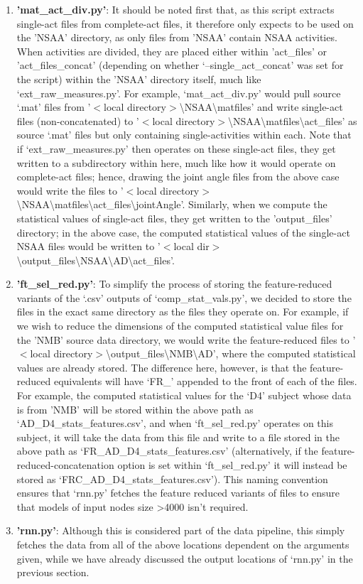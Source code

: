 \documentclass[12pt,twoside]{report}
\begin{document}
\begin{enumerate}
	\item \textbf{'mat\_act\_div.py'}: It should be noted first that, as this script extracts single-act files from complete-act files, it therefore only expects to be used on the 'NSAA' directory, as only files from 'NSAA' contain NSAA activities. When activities are divided, they are placed either within 'act\_files' or 'act\_files\_concat' (depending on whether ‘--single\_act\_concat’ was set for the script) within the 'NSAA' directory itself, much like ‘ext\_raw\_measures.py’. For example, ‘mat\_act\_div.py’ would pull source ‘.mat’ files from '$<$local directory$>$\textbackslash NSAA\textbackslash matfiles' and write single-act files (non-concatenated) to '$<$local directory$>$\textbackslash NSAA\textbackslash matfiles\textbackslash act\_files' as source ‘.mat’ files but only containing single-activities within each. Note that if ‘ext\_raw\_measures.py’ then operates on these single-act files, they get written to a subdirectory within here, much like how it would operate on complete-act files; hence, drawing the joint angle files from the above case would write the files to '$<$local directory$>$\textbackslash NSAA\textbackslash matfiles\textbackslash act\_files\textbackslash jointAngle'. Similarly, when we compute the statistical values of single-act files, they get written to the 'output\_files' directory; in the above case, the computed statistical values of the single-act NSAA files would be written to '$<$local dir$>$\textbackslash output\_files\textbackslash NSAA\textbackslash AD\textbackslash act\_files'.
	\item \textbf{'ft\_sel\_red.py'}: To simplify the process of storing the feature-reduced variants of the ‘.csv’ outputs of ‘comp\_stat\_vals.py’, we decided to store the files in the exact same directory as the files they operate on. For example, if we wish to reduce the dimensions of the computed statistical value files for the 'NMB' source data directory, we would write the feature-reduced files to '$<$local directory$>$\textbackslash output\_files\textbackslash NMB\textbackslash AD', where the computed statistical values are already stored. The difference here, however, is that the feature-reduced equivalents will have ‘FR\_’ appended to the front of each of the files. For example, the computed statistical values for the ‘D4’ subject whose data is from 'NMB' will be stored within the above path as ‘AD\_D4\_stats\_features.csv’, and when ‘ft\_sel\_red.py’ operates on this subject, it will take the data from this file and write to a file stored in the above path as ‘FR\_AD\_D4\_stats\_features.csv’ (alternatively, if the feature-reduced-concatenation option is set within ‘ft\_sel\_red.py’ it will instead be stored as ‘FRC\_AD\_D4\_stats\_features.csv’). This naming convention ensures that ‘rnn.py’ fetches the feature reduced variants of files to ensure that models of input nodes size >4000 isn’t required.
	\item \textbf{'rnn.py'}: Although this is considered part of the data pipeline, this simply fetches the data from all of the above locations dependent on the arguments given, while we have already discussed the output locations of ‘rnn.py’ in the previous section.
\end{enumerate}
\end{document}
